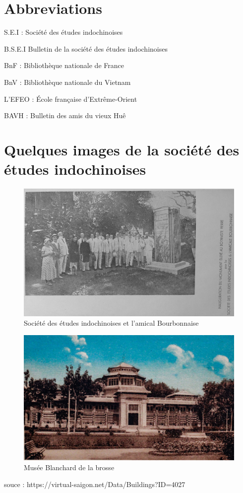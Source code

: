 \newpage
\section{Abbreviations}
S.E.I : Société des études indochinoises

B.S.E.I Bulletin de la société des études indochinoises

BnF : Bibliothèque nationale de France

BnV : Bibliothèque nationale du Vietnam

L'EFEO : École française d'Extrême-Orient

BAVH : Bulletin des amis du vieux Huê

\newpage
\section{Quelques images de la société des études indochinoises}

\begin{figure}[H] %
    \centering
    \includegraphics[width=1\linewidth]{img/société des études indochinoise.PNG}
    \caption{Société des études indochinoises et l'amical Bourbonnaise}
    \label{fig:enter-label}
\end{figure}

\begin{figure}[H] %
    \centering
    \includegraphics[width=1\linewidth]{img/museee.jpg}
    \caption{Musée Blanchard de la brosse}
    \label{fig:enter-label}
\end{figure}
souce : https://virtual-saigon.net/Data/Buildings?ID=4027

